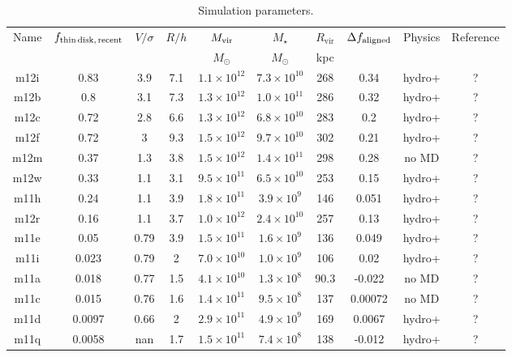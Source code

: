 \documentclass[fleqn,usenatbib]{mnras}
\begin{document}
\begin{table}
\caption{Simulation parameters.}
\begin{tabular}{cccccccccc}
\hline
Name  &  $f_{\rm thin\,disk,\,recent}$  & $V/\sigma$ & $R/h$ & $M_{\rm vir}$  &  $M_\star$  &  $R_{\textrm{vir}}$  &  $\Delta f_{\rm aligned}$  &  Physics  &  Reference  \\
  &   & & &  $M_\odot$  & $M_\odot$  &  kpc  &  &  &  \\
 \hline
m12i  &  0.83  &  3.9  &  7.1  &  $1.1\times10^{12}$  &  $7.3\times10^{10}$  &  268  &  0.34  &  hydro+  &  ?    \\
m12b  &  0.8  &  3.1  &  7.3  &  $1.3\times10^{12}$  &  $1.0\times10^{11}$  &  286  &  0.32  &  hydro+  &  ?    \\
m12c  &  0.72  &  2.8  &  6.6  &  $1.3\times10^{12}$  &  $6.8\times10^{10}$  &  283  &  0.2  &  hydro+  &  ?    \\
m12f  &  0.72  &  3  &  9.3  &  $1.5\times10^{12}$  &  $9.7\times10^{10}$  &  302  &  0.21  &  hydro+  &  ?    \\
m12m  &  0.37  &  1.3  &  3.8  &  $1.5\times10^{12}$  &  $1.4\times10^{11}$  &  298  &  0.28  &  no MD  &  ?    \\
m12w  &  0.33  &  1.1  &  3.1  &  $9.5\times10^{11}$  &  $6.5\times10^{10}$  &  253  &  0.15  &  hydro+  &  ?    \\
m11h  &  0.24  &  1.1  &  3.9  &  $1.8\times10^{11}$  &  $3.9\times10^{9}$  &  146  &  0.051  &  hydro+  &  ?    \\
m12r  &  0.16  &  1.1  &  3.7  &  $1.0\times10^{12}$  &  $2.4\times10^{10}$  &  257  &  0.13  &  hydro+  &  ?    \\
m11e  &  0.05  &  0.79  &  3.9  &  $1.5\times10^{11}$  &  $1.6\times10^{9}$  &  136  &  0.049  &  hydro+  &  ?    \\
m11i  &  0.023  &  0.79  &  2  &  $7.0\times10^{10}$  &  $1.0\times10^{9}$  &  106  &  0.02  &  hydro+  &  ?    \\
m11a  &  0.018  &  0.77  &  1.5  &  $4.1\times10^{10}$  &  $1.3\times10^{8}$  &  90.3  &  -0.022  &  no MD  &  ?    \\
m11c  &  0.015  &  0.76  &  1.6  &  $1.4\times10^{11}$  &  $9.5\times10^{8}$  &  137  &  0.00072  &  no MD  &  ?    \\
m11d  &  0.0097  &  0.66  &  2  &  $2.9\times10^{11}$  &  $4.9\times10^{9}$  &  169  &  0.0067  &  hydro+  &  ?    \\
m11q  &  0.0058  &  nan  &  1.7  &  $1.5\times10^{11}$  &  $7.4\times10^{8}$  &  138  &  -0.012  &  hydro+  &  ?    \\

\end{tabular}
\end{table}
\end{document}
